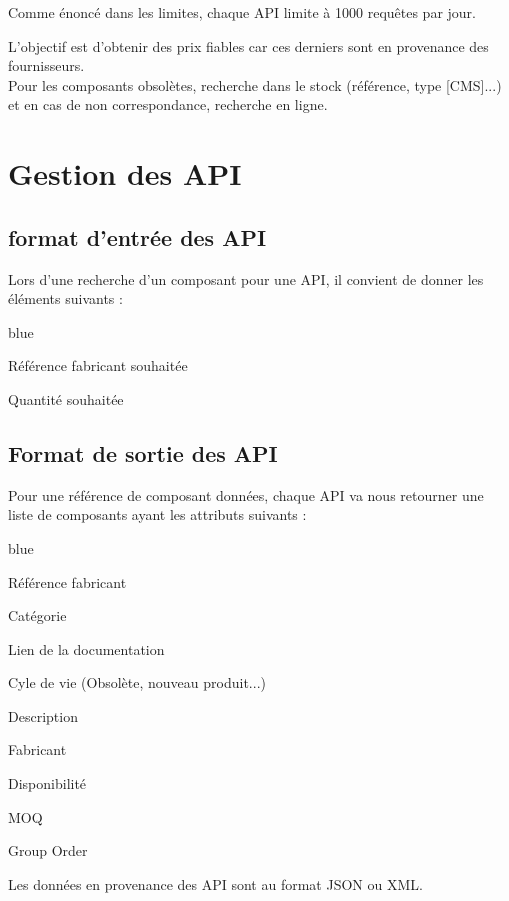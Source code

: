 Comme énoncé dans les limites, chaque API limite à 1000 requêtes par jour.

L’objectif est d’obtenir des prix fiables car ces derniers sont en provenance des fournisseurs.\\

Pour les composants obsolètes, recherche dans le stock (référence, type [CMS]...) et en cas de non correspondance, recherche en ligne.


\section{Gestion des API}

\subsection{format d'entrée des API}

Lors d'une recherche d'un composant pour une API, il convient de donner les éléments suivants : 

\begin{items}{blue}{\Bullet}
\item Référence fabricant souhaitée
\item Quantité souhaitée
\end{items}

\subsection{Format de sortie des API}
Pour une référence de composant données, chaque API va nous retourner une liste de composants ayant les attributs suivants : 

\begin{items}{blue}{\Bullet}
\item Référence fabricant
\item Catégorie
\item Lien de la documentation
\item Cyle de vie (Obsolète, nouveau produit...)
\item Description
\item Fabricant
\item Disponibilité
\item MOQ
\item Group Order\\
\end{items}

Les données en provenance des API sont au format JSON ou XML.


